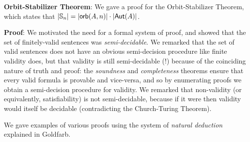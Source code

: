 \begin{mdframed}[linewidth=1]
\textbf{Orbit-Stabilizer Theorem}: We gave a proof for the Orbit-Stabilizer Theorem, which states that $|\mbox{$\mathbb{S}_{n}$}| = |\mbox{$\mathsf{orb}(A,n)$}| \cdot |\mbox{$\mathsf{Aut}(A)$}|$. 

\textbf{Proof}: We motivated the need for a formal system of proof, and showed that the set of finitely-valid sentences was \emph{semi-decidable}. We remarked that the set of valid sentences does not have an obvious semi-decision procedure like finite validity does, but that validity is still semi-decidable (!) because of the coinciding nature of truth and proof: the \emph{soundness} and \emph{completeness} theorems ensure that every valid formula is provable and vice-versa, and so by enumerating proofs we obtain a semi-decision procedure for validity. We remarked that non-validity (or equivalently, satisfiability) is not semi-decidable, because if it were then validity would itself be decidable (contradicting the Church-Turing Theorem). 

We gave examples of various proofs using the system of \emph{natural deduction} explained in Goldfarb. 
\end{mdframed}



